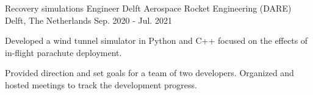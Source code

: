   \cventry
    {Recovery simulations Engineer } %
    {Delft Aerospace Rocket Engineering (DARE) } %
    {Delft, The Netherlands} %
    {Sep. 2020 - Jul. 2021} %
    {
      \begin{cvitems} %
        \item {Developed a wind tunnel simulator in Python and C++ focused on the effects of in-flight parachute deployment.}
        \item {Provided direction and set goals for a team of two developers. Organized and hosted meetings to track the development progress.}
      \end{cvitems}
    }

